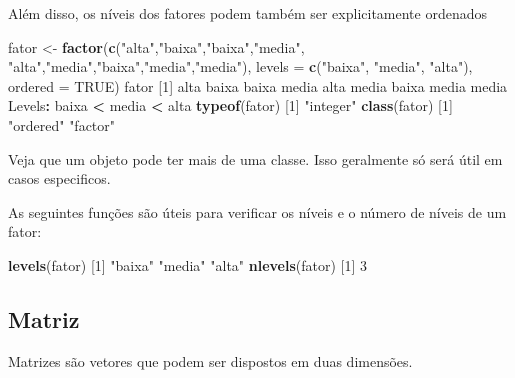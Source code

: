 \documentclass[10pt,a4paper]{book}
\newenvironment{Shaded}{\begin{snugshade}}{\end{snugshade}}
\newcommand{\KeywordTok}[1]{\textcolor[rgb]{0.13,0.29,0.53}{\textbf{#1}}}
\newcommand{\DataTypeTok}[1]{\textcolor[rgb]{0.13,0.29,0.53}{#1}}
\newcommand{\DecValTok}[1]{\textcolor[rgb]{0.00,0.00,0.81}{#1}}
\newcommand{\StringTok}[1]{\textcolor[rgb]{0.31,0.60,0.02}{#1}}
\newcommand{\OtherTok}[1]{\textcolor[rgb]{0.56,0.35,0.01}{#1}}
\newcommand{\OperatorTok}[1]{\textcolor[rgb]{0.81,0.36,0.00}{\textbf{#1}}}
\newcommand{\NormalTok}[1]{#1}
\begin{document}
Além disso, os níveis dos fatores podem também ser explicitamente
ordenados

\begin{Shaded}
\begin{Highlighting}[]
\NormalTok{fator <-}\StringTok{ }\KeywordTok{factor}\NormalTok{(}\KeywordTok{c}\NormalTok{(}\StringTok{"alta"}\NormalTok{,}\StringTok{"baixa"}\NormalTok{,}\StringTok{"baixa"}\NormalTok{,}\StringTok{"media"}\NormalTok{,}
                  \StringTok{"alta"}\NormalTok{,}\StringTok{"media"}\NormalTok{,}\StringTok{"baixa"}\NormalTok{,}\StringTok{"media"}\NormalTok{,}\StringTok{"media"}\NormalTok{),}
                \DataTypeTok{levels =} \KeywordTok{c}\NormalTok{(}\StringTok{"baixa"}\NormalTok{, }\StringTok{"media"}\NormalTok{, }\StringTok{"alta"}\NormalTok{),}
                \DataTypeTok{ordered =} \OtherTok{TRUE}\NormalTok{)}
\NormalTok{fator}
\NormalTok{[}\DecValTok{1}\NormalTok{] alta  baixa baixa media alta  media baixa media media}
\NormalTok{Levels}\OperatorTok{:}\StringTok{ }\NormalTok{baixa }\OperatorTok{<}\StringTok{ }\NormalTok{media }\OperatorTok{<}\StringTok{ }\NormalTok{alta}
\KeywordTok{typeof}\NormalTok{(fator)}
\NormalTok{[}\DecValTok{1}\NormalTok{] }\StringTok{"integer"}
\KeywordTok{class}\NormalTok{(fator)}
\NormalTok{[}\DecValTok{1}\NormalTok{] }\StringTok{"ordered"} \StringTok{"factor"} 
\end{Highlighting}
\end{Shaded}

Veja que um objeto pode ter mais de uma classe. Isso geralmente só será
útil em casos especificos.

As seguintes funções são úteis para verificar os níveis e o número de
níveis de um fator:

\begin{Shaded}
\begin{Highlighting}[]
\KeywordTok{levels}\NormalTok{(fator)}
\NormalTok{[}\DecValTok{1}\NormalTok{] }\StringTok{"baixa"} \StringTok{"media"} \StringTok{"alta"} 
\KeywordTok{nlevels}\NormalTok{(fator)}
\NormalTok{[}\DecValTok{1}\NormalTok{] }\DecValTok{3}
\end{Highlighting}
\end{Shaded}

\subsection{Matriz}\label{matriz}

Matrizes são vetores que podem ser dispostos em duas dimensões.
\end{document}
